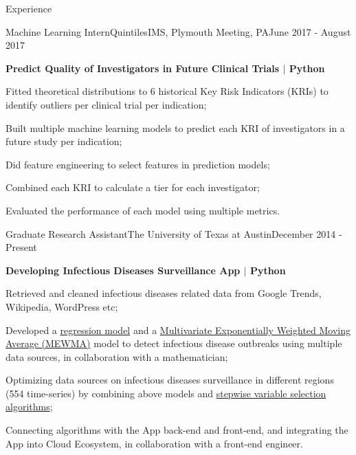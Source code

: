 \documentclass{my_resume} %
\begin{document}

\begin{rSection}{Experience}

  \begin{rSubsection}{Machine Learning Intern}{QuintilesIMS, Plymouth Meeting,
    PA}{June 2017 - August 2017}

  \item[] \textbf{Predict Quality of Investigators in Future Clinical Trials $|$ Python}
  \item Fitted theoretical distributions to 6 historical Key Risk Indicators
     (KRIs) to identify outliers per clinical trial per indication;
  \item Built multiple machine learning models to predict each KRI of
     investigators in a future study per indication;
  \item Did feature engineering to select features in prediction models;
  \item Combined each KRI to calculate a tier for each investigator;
  \item Evaluated the performance of each model using multiple metrics.
  \end{rSubsection}

  \begin{rSubsection}{Graduate Research Assistant}{The University of Texas at
    Austin}{December 2014 - Present}

  \item[] \textbf{Developing Infectious Diseases Surveillance App $|$ Python}
  \item Retrieved and cleaned infectious diseases related data from Google
    Trends, Wikipedia, WordPress etc;
  \item Developed a \underline{regression model} and a \underline{Multivariate
      Exponentially Weighted Moving Average (MEWMA)} model to detect infectious
      disease outbreaks using multiple data sources, in collaboration with a
      mathematician;
  \item Optimizing data sources on infectious diseases surveillance in
    different regions (554 time-series) by combining above models and
    \underline{stepwise variable selection algorithms};
  \item Connecting algorithms with the App back-end and front-end, and
    integrating the App into Cloud Ecosystem, in collaboration with a front-end
    engineer.


\end{rSubsection}
\end{rSection}
\end{document}
